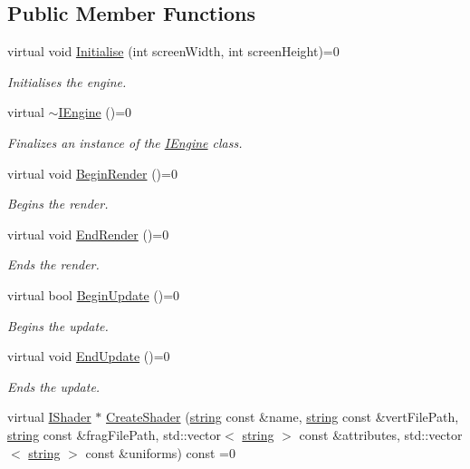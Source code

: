 \subsection*{Public Member Functions}
\begin{DoxyCompactItemize}
\item 
virtual void \hyperlink{class_i_engine_a2033b147f3b325d0194b746048a6200e}{Initialise} (int screen\+Width, int screen\+Height)=0
\begin{DoxyCompactList}\small\item\em Initialises the engine. \end{DoxyCompactList}\item 
virtual \hyperlink{class_i_engine_a9f19a2407bedf3c6dde4ae8cfc161163}{$\sim$\+I\+Engine} ()=0
\begin{DoxyCompactList}\small\item\em Finalizes an instance of the \hyperlink{class_i_engine}{I\+Engine} class. \end{DoxyCompactList}\item 
virtual void \hyperlink{class_i_engine_ac07a33654b17337655bb1e36f28991bb}{Begin\+Render} ()=0
\begin{DoxyCompactList}\small\item\em Begins the render. \end{DoxyCompactList}\item 
virtual void \hyperlink{class_i_engine_a07693c65faccf9ae4d75ef6f916e6e25}{End\+Render} ()=0
\begin{DoxyCompactList}\small\item\em Ends the render. \end{DoxyCompactList}\item 
virtual bool \hyperlink{class_i_engine_a5da41643af01472fe1b4aa0ac84fb447}{Begin\+Update} ()=0
\begin{DoxyCompactList}\small\item\em Begins the update. \end{DoxyCompactList}\item 
virtual void \hyperlink{class_i_engine_afbacb27cbd19a8d63dbd6c40e4f089f9}{End\+Update} ()=0
\begin{DoxyCompactList}\small\item\em Ends the update. \end{DoxyCompactList}\item 
virtual \hyperlink{class_i_shader}{I\+Shader} $\ast$ \hyperlink{class_i_engine_aa42fdef0b3b3741e4a4de1821aaa8cd6}{Create\+Shader} (\hyperlink{_types_8h_ad453f9f71ce1f9153fb748d6bb25e454}{string} const \&name, \hyperlink{_types_8h_ad453f9f71ce1f9153fb748d6bb25e454}{string} const \&vert\+File\+Path, \hyperlink{_types_8h_ad453f9f71ce1f9153fb748d6bb25e454}{string} const \&frag\+File\+Path, std\+::vector$<$ \hyperlink{_types_8h_ad453f9f71ce1f9153fb748d6bb25e454}{string} $>$ const \&attributes, std\+::vector$<$ \hyperlink{_types_8h_ad453f9f71ce1f9153fb748d6bb25e454}{string} $>$ const \&uniforms) const  =0

\end{DoxyCompactItemize}
